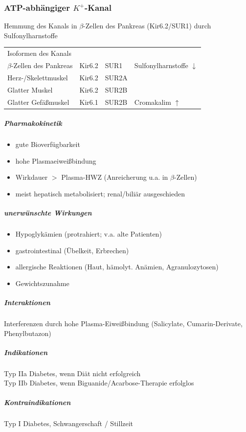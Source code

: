 \documentclass[10pt,a4paper]{report}
\begin{document}
\subsubsection{ATP-abhängiger $K^+$-Kanal} %
\label{ssub:atp_abh_ngiger_k_kanal}
Hemmung des Kanals in $\beta$-Zellen des Pankreas (Kir6.2/SUR1) durch Sulfonylharnstoffe \\
\begin{tabularx}{\textwidth}{XXXX}
Isoformen des Kanals&&&\\
$\beta$-Zellen des Pankreas&Kir6.2&SUR1&Sulfonylharnstoffe $\downarrow$\\
Herz-/Skelettmuskel&Kir6.2&SUR2A&\\
Glatter Muskel&Kir6.2&SUR2B\\
Glatter Gefäßmuskel&Kir6.1&SUR2B&Cromakalim $\uparrow$\\
\end{tabularx} 
\subparagraph{Pharmakokinetik} %
\label{subp:pharmakokinetik}
\begin{itemize}
	\item gute Bioverfügbarkeit
	\item hohe Plasmaeiweißbindung
	\item Wirkdauer $>$ Plasma-HWZ (Anreicherung u.a. in $\beta$-Zellen)
	\item meist hepatisch metabolisiert; renal/biliär ausgeschieden
\end{itemize}
\subparagraph{unerwünschte Wirkungen} %
\label{subp:unerw_nschte_wirkungen}
\begin{itemize}
	\item  Hypoglykämien (protrahiert; v.a. alte Patienten)
	\item gastrointestinal (Übelkeit, Erbrechen)
	\item allergische Reaktionen (Haut, hämolyt. Anämien, Agranulozytosen)
	\item Gewichtszunahme
\end{itemize}
\subparagraph{Interaktionen} %
\label{subp:interaktionen}
Interferenzen durch hohe Plasma-Eiweißbindung (Salicylate, Cumarin-Derivate, Phenylbutazon)
\subparagraph{Indikationen} %
\label{subp:indikationen}
Typ IIa Diabetes, wenn Diät nicht erfolgreich\\
Typ IIb Diabetes, wenn Biguanide/Acarbose-Therapie erfolglos
\subparagraph{Kontraindikationen} %
\label{subp:kontraindikationen}
 Typ I Diabetes, Schwangerschaft / Stillzeit
\end{document}
